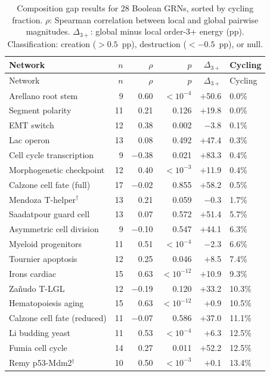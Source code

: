 \documentclass[10pt]{article}
\begin{document}
\begin{longtable}{lrrrrl}
\caption{Composition gap results for 28 Boolean GRNs, sorted by
cycling fraction. $\rho$: Spearman correlation between local and
global pairwise magnitudes. $\Delta_{3+}$: global minus local
order-3+ energy (pp). Classification: creation ($> 0.5$~pp),
destruction ($< -0.5$~pp), or null.}
\label{tab:all_results} \\
\toprule
Network & $n$ & $\rho$ & $p$ & $\Delta_{3+}$ & Cycling \\
\midrule
\endfirsthead
\toprule
Network & $n$ & $\rho$ & $p$ & $\Delta_{3+}$ & Cycling \\
\midrule
\endhead
\bottomrule
\endfoot
Arellano root stem & 9 & 0.60 & $< 10^{-4}$ & $+$50.6 & 0.0\% \\
Segment polarity & 11 & 0.21 & 0.126 & $+$19.8 & 0.0\% \\
EMT switch & 12 & 0.38 & 0.002 & $-$3.8 & 0.1\% \\
Lac operon & 13 & 0.08 & 0.492 & $+$47.4 & 0.3\% \\
Cell cycle transcription & 9 & $-$0.38 & 0.021 & $+$83.3 & 0.4\% \\
Morphogenetic checkpoint & 12 & 0.40 & $< 10^{-3}$ & $+$11.9 & 0.4\% \\
Calzone cell fate (full) & 17 & $-$0.02 & 0.855 & $+$58.2 & 0.5\% \\
Mendoza T-helper$^\dagger$ & 13 & 0.21 & 0.059 & $-$0.3 & 1.7\% \\
Saadatpour guard cell & 13 & 0.07 & 0.572 & $+$51.4 & 5.7\% \\
Asymmetric cell division & 9 & $-$0.10 & 0.547 & $+$44.1 & 6.3\% \\
Myeloid progenitors & 11 & 0.51 & $< 10^{-4}$ & $-$2.3 & 6.6\% \\
Tournier apoptosis & 12 & 0.25 & 0.046 & $+$8.5 & 7.4\% \\
Irons cardiac & 15 & 0.63 & $< 10^{-12}$ & $+$10.9 & 9.3\% \\
Za\~nudo T-LGL & 12 & $-$0.19 & 0.120 & $+$33.2 & 10.3\% \\
Hematopoiesis aging & 15 & 0.63 & $< 10^{-12}$ & $+$0.9 & 10.5\% \\
Calzone cell fate (reduced) & 11 & $-$0.07 & 0.586 & $+$37.0 & 11.1\% \\
Li budding yeast & 11 & 0.53 & $< 10^{-4}$ & $+$6.3 & 12.5\% \\
Fumia cell cycle & 14 & 0.27 & 0.011 & $+$52.2 & 12.5\% \\
Remy p53-Mdm2$^\dagger$ & 10 & 0.50 & $< 10^{-3}$ & $+$0.1 & 13.4\% \\

\end{longtable}
\end{document}
